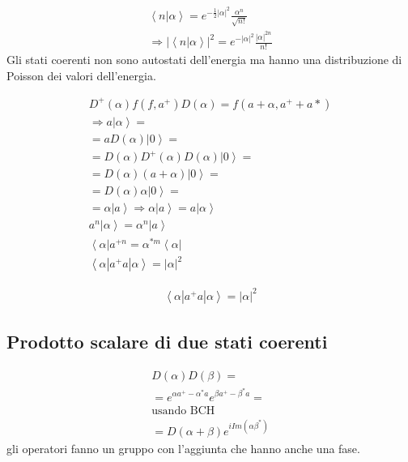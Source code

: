 \begin{equation}\begin{split}
\left\langle n|\alpha \right\rangle=e^{-\frac{1}{2}|\alpha|^2}\frac{\alpha^n}{\sqrt{n!}} \\
\Longrightarrow \left|\left\langle n|\alpha \right\rangle \right|^2=e^{-|\alpha|^2}\frac{|\alpha|^{2n}}{n!}
\end{split}\end{equation}
Gli stati coerenti non sono autostati dell'energia ma hanno una distribuzione di Poisson dei valori dell'energia.

\begin{equation}\begin{split}
D^+\left(\alpha\right)f\left(f,a^+\right)D\left(\alpha\right)=f\left(a+\alpha,a^++a*\right)\\
\Longrightarrow a\left |\alpha \right\rangle=\\
=aD\left(\alpha\right)\left |0 \right\rangle=\\
=D\left(\alpha\right)D^+\left(\alpha\right)D\left(\alpha\right)\left |0 \right\rangle=\\
=D\left(\alpha\right)\left(a+\alpha\right)\left |0 \right\rangle=\\
=D\left(\alpha\right)\alpha\left |0 \right\rangle=\\
=\alpha\left |a \right\rangle
\Longrightarrow \alpha\left |a \right\rangle=a\left |\alpha \right\rangle\\
a^n\left |\alpha \right\rangle=\alpha^n\left |a \right\rangle\\
\left\langle \alpha\right |a^{+n}=\alpha^{*m}\left\langle \alpha\right |\\
\left\langle \alpha|a^+a|\alpha \right\rangle=|\alpha|^2
\end{split}\end{equation}

\begin{equation}\begin{split}
\left\langle \alpha|a^+a|\alpha \right\rangle=|\alpha|^2
\end{split}\end{equation}

\subsection{Prodotto scalare di due stati coerenti}
\begin{equation}\begin{split}
D\left(\alpha\right)D\left(\beta\right)=\\
=e^{\alpha a^+-\alpha^*a}e^{\beta a^+-\beta^*a}=\\
\textrm{usando BCH}\\
=D\left(\alpha+\beta\right)e^{i Im{\left(\alpha\beta^*\right)}}
\end{split}\end{equation}
gli operatori fanno un gruppo con l'aggiunta che hanno anche una fase.

